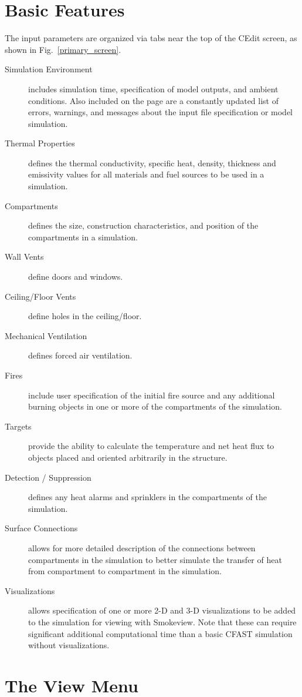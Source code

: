 \section{Basic Features}

The input parameters are organized via tabs near the top of the CEdit screen, as shown in Fig.~\ref{primary_screen}.
\begin{description}
\item[Simulation Environment] includes simulation time, specification of model outputs, and ambient conditions. Also included on the page are a constantly updated list of errors, warnings, and messages about the input file specification or model simulation.
\item[Thermal Properties] defines the thermal conductivity, specific heat, density, thickness and emissivity values for all materials and fuel sources to be used in a simulation.
\item[Compartments] defines the size, construction characteristics, and position of the compartments in a simulation.
\item[Wall Vents] define doors and windows.
\item[Ceiling/Floor Vents] define holes in the ceiling/floor.
\item[Mechanical Ventilation] defines forced air ventilation.
\item[Fires] include user specification of the initial fire source and any additional burning objects in one or more of the compartments of the simulation.
\item[Targets] provide the ability to calculate the temperature and net heat flux to objects placed and oriented arbitrarily in the structure.
\item[Detection / Suppression] defines any heat alarms and sprinklers in the compartments of the simulation.
\item[Surface Connections] allows for more detailed description of the connections between compartments in the simulation to better simulate the transfer of heat from compartment to compartment in the simulation.
\item[Visualizations] allows specification of one or more 2-D and 3-D visualizations to be added to the simulation for viewing with Smokeview. Note that these can require significant additional computational time than a basic CFAST simulation without visualizations.
\end{description}


\section{The View Menu}

